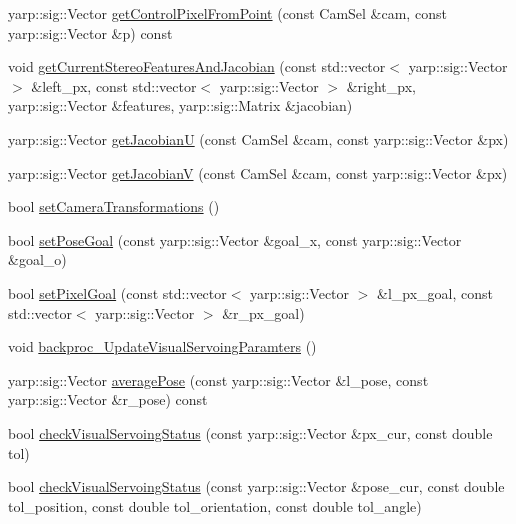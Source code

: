 \begin{DoxyCompactItemize}
\item 
yarp\+::sig\+::\+Vector \hyperlink{classVisualServoingServer_a43cf45e933a71214cfb4d8248005761e}{get\+Control\+Pixel\+From\+Point} (const Cam\+Sel \&cam, const yarp\+::sig\+::\+Vector \&p) const
\item 
void \hyperlink{classVisualServoingServer_ad5334ed717f373cfbd40290824d9ed1f}{get\+Current\+Stereo\+Features\+And\+Jacobian} (const std\+::vector$<$ yarp\+::sig\+::\+Vector $>$ \&left\+\_\+px, const std\+::vector$<$ yarp\+::sig\+::\+Vector $>$ \&right\+\_\+px, yarp\+::sig\+::\+Vector \&features, yarp\+::sig\+::\+Matrix \&jacobian)
\item 
yarp\+::sig\+::\+Vector \hyperlink{classVisualServoingServer_a3aa225c2c4f417c4ea7dd27e9b6d0c8a}{get\+JacobianU} (const Cam\+Sel \&cam, const yarp\+::sig\+::\+Vector \&px)
\item 
yarp\+::sig\+::\+Vector \hyperlink{classVisualServoingServer_a51667642f6d882df082f79ec01111181}{get\+JacobianV} (const Cam\+Sel \&cam, const yarp\+::sig\+::\+Vector \&px)
\item 
bool \hyperlink{classVisualServoingServer_a141036fb33bfb74199691ad444b29082}{set\+Camera\+Transformations} ()
\item 
bool \hyperlink{classVisualServoingServer_a53616791e66a24c1131e2cb3a3634a6d}{set\+Pose\+Goal} (const yarp\+::sig\+::\+Vector \&goal\+\_\+x, const yarp\+::sig\+::\+Vector \&goal\+\_\+o)
\item 
bool \hyperlink{classVisualServoingServer_aea96fc77c6255e0826bd17190214a29b}{set\+Pixel\+Goal} (const std\+::vector$<$ yarp\+::sig\+::\+Vector $>$ \&l\+\_\+px\+\_\+goal, const std\+::vector$<$ yarp\+::sig\+::\+Vector $>$ \&r\+\_\+px\+\_\+goal)
\item 
void \hyperlink{classVisualServoingServer_abe1d3c25e81378f9a1a834d64cf0c496}{backproc\+\_\+\+Update\+Visual\+Servoing\+Paramters} ()
\item 
yarp\+::sig\+::\+Vector \hyperlink{classVisualServoingServer_a66e3aaa742d5b0d23a6d3a33a800c088}{average\+Pose} (const yarp\+::sig\+::\+Vector \&l\+\_\+pose, const yarp\+::sig\+::\+Vector \&r\+\_\+pose) const
\item 
bool \hyperlink{classVisualServoingServer_a6201a672d3efe497dd0114df50aee4d7}{check\+Visual\+Servoing\+Status} (const yarp\+::sig\+::\+Vector \&px\+\_\+cur, const double tol)
\item 
bool \hyperlink{classVisualServoingServer_afbcab623f48e3d2e648e144e22df4f19}{check\+Visual\+Servoing\+Status} (const yarp\+::sig\+::\+Vector \&pose\+\_\+cur, const double tol\+\_\+position, const double tol\+\_\+orientation, const double tol\+\_\+angle)

\end{DoxyCompactItemize}
